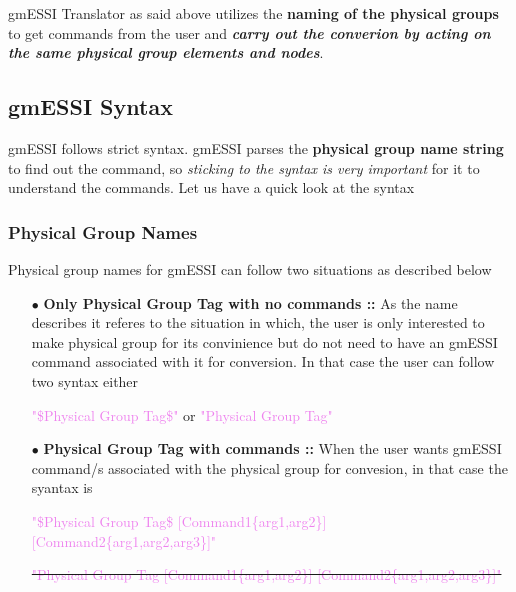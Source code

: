 \documentclass[11pt]{article}
\begin{document}
gmESSI Translator as said above utilizes the \textbf{naming of the physical
groups} to get commands from the user and \textit{\textbf{carry out the
converion by acting on the same physical group elements and nodes}}.

\subsection{gmESSI Syntax}

gmESSI follows strict syntax. gmESSI parses the \textbf{physical group name
string} to find out the command, so \textit{sticking to the syntax is very
important} for it to understand the commands. Let us have a quick look at the
syntax

\subsubsection{Physical Group Names}

Physical group names for gmESSI can follow two situations as described below

\begin{itemize}

  \item[$\bullet$] \textbf{Only Physical Group Tag with no commands ::} 
  As the name describes it referes to the situation in which, the user is only 
  interested to make physical group for its convinience but do not need to have 
  an gmESSI command associated with it for conversion. In that case the user  
  can follow two syntax either\\    
  \centerline {\textcolor{violet}{"\$Physical Group Tag\$"} or 
  \textcolor{violet}{"Physical Group Tag"}}

  \item[$\bullet$] \textbf{Physical Group Tag with commands ::} When the user
  wants gmESSI command/s associated with the physical group for convesion,    in
  that case the syantax is \\ 

  \centerline {\textcolor{violet}{"\$Physical
  Group Tag\$ [Command1\{arg1,arg2\}]  [Command2\{arg1,arg2,arg3\}]"}}

  \centerline{\sout{\textcolor{violet}{"Physical Group Tag
  [Command1\{arg1,arg2\}]  [Command2\{arg1,arg2,arg3\}]"}}} 

\end {itemize}
\end{document}
